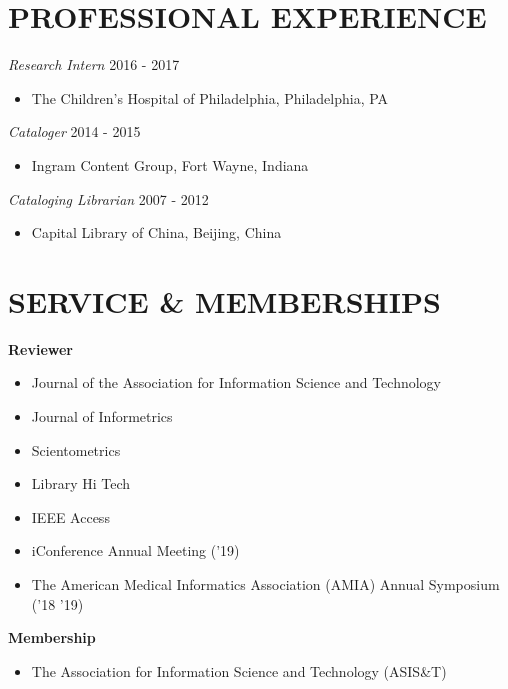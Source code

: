 \documentclass[margin, 10pt]{res} %
\begin{document}
\begin{resume}
\section{PROFESSIONAL EXPERIENCE}

\textit{Research Intern} \hfill 2016 - 2017
\begin{itemize}
\item The Children’s Hospital of Philadelphia, Philadelphia, PA
\end{itemize}

\textit{Cataloger} \hfill 2014 - 2015
\begin{itemize}
\item Ingram Content Group, Fort Wayne, Indiana
\end{itemize}

\textit{Cataloging Librarian} \hfill 2007 - 2012
\begin{itemize}
\item Capital Library of China, Beijing, China
\end{itemize}

\section{SERVICE \& MEMBERSHIPS}

\textbf{Reviewer}
\begin{itemize}
\item Journal of the Association for Information Science and Technology
\item Journal of Informetrics
\item Scientometrics
\item Library Hi Tech
\item IEEE Access
\item iConference Annual Meeting ('19)
\item The American Medical Informatics Association (AMIA) Annual Symposium ('18 '19)
\end{itemize}

\textbf{Membership}
\begin{itemize}
\item The Association for Information Science and Technology (ASIS\&T)
\end{itemize}



\end{resume}
\end{document}
